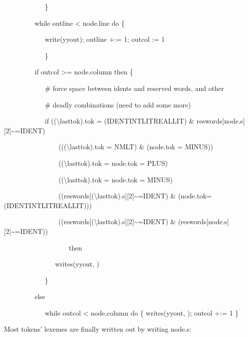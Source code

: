 {\ttfamily\mdseries
\ \ \ \ \ \ \ \ \ \ \ \ \}}

{\ttfamily\mdseries
\ \ \ \ \ \ \ \ \ while outline {\textless} node.line do \{}

{\ttfamily\mdseries
\ \ \ \ \ \ \ \ \ \ \ \ write(yyout); outline +:= 1; outcol := 1}

{\ttfamily\mdseries
\ \ \ \ \ \ \ \ \ \ \ \ \}}

{\ttfamily\mdseries
\ \ \ \ \ \ \ \ \ if outcol {\textgreater}= node.column then \{}

{\ttfamily\mdseries
\ \ \ \ \ \ \ \ \ \ \ \ \# force space between idents and reserved words, and other}

{\ttfamily\mdseries
\ \ \ \ \ \ \ \ \ \ \ \ \# deadly combinations (need to add some more)}

{\ttfamily\mdseries
\ \ \ \ \ \ \ \ \ \ \ \ if (({\textbackslash}lasttok).tok = (IDENT{\textbar}INTLIT{\textbar}REALLIT) \&
reswords[node.s][2]\~{}=IDENT){\textbar}}

{\ttfamily\mdseries
\ \ \ \ \ \ \ \ \ \ \ \ \ \ \ \ ((({\textbackslash}lasttok).tok = NMLT) \& (node.tok = MINUS)) {\textbar}}

{\ttfamily\mdseries
\ \ \ \ \ \ \ \ \ \ \ \ \ \ \ \ (({\textbackslash}lasttok).tok = node.tok = PLUS) {\textbar}}

{\ttfamily\mdseries
\ \ \ \ \ \ \ \ \ \ \ \ \ \ \ \ (({\textbackslash}lasttok).tok = node.tok = MINUS) {\textbar}}

{\ttfamily\mdseries
\ \ \ \ \ \ \ \ \ \ \ \ \ \ \ \ ((reswords[({\textbackslash}lasttok).s][2]\~{}=IDENT) \&
(node.tok=(IDENT{\textbar}INTLIT{\textbar}REALLIT))){\textbar}}

{\ttfamily\mdseries
\ \ \ \ \ \ \ \ \ \ \ \ \ \ \ \ ((reswords[({\textbackslash}lasttok).s][2]\~{}=IDENT) \&
(reswords[node.s][2]\~{}=IDENT))}

{\ttfamily\mdseries
\ \ \ \ \ \ \ \ \ \ \ \ \ \ \ \ \ \ \ then}

{\ttfamily\mdseries
\ \ \ \ \ \ \ \ \ \ \ \ \ \ \ writes(yyout, {\textquotedbl} {\textquotedbl})}

{\ttfamily\mdseries
\ \ \ \ \ \ \ \ \ \ \ \ \}}

{\ttfamily\mdseries
\ \ \ \ \ \ \ \ \ else}

{\ttfamily\mdseries
\ \ \ \ \ \ \ \ \ \ \ \ while outcol {\textless} node.column do \{ writes(yyout, {\textquotedbl} {\textquotedbl});
outcol +:= 1 \}}


Most tokens' lexemes are finally written out by writing node.s: 

